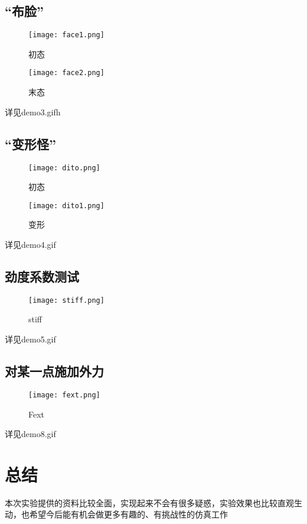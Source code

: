 \documentclass[14pt]{scrartcl} %
\begin{document}
\pagebreak
\subsection{“布脸”}
\begin{figure}[h] %
	\centering
	\texttt{[image: face1.png]} %
	\caption{初态}
\end{figure}
\begin{figure}[h] %
	\centering
	\texttt{[image: face2.png]} %
	\caption{末态}
\end{figure}
详见demo3.gifh

\pagebreak
\subsection{“变形怪”}
\begin{figure}[h] %
	\centering
	\texttt{[image: dito.png]} %
	\caption{初态}
\end{figure}
\begin{figure}[h] %
	\centering
	\texttt{[image: dito1.png]} %
	\caption{变形}
\end{figure}
详见demo4.gif

\pagebreak
\subsection{劲度系数测试}
\begin{figure}[h] %
	\centering
	\texttt{[image: stiff.png]} %
	\caption{stiff}
\end{figure}
详见demo5.gif

\subsection{对某一点施加外力}

\begin{figure}[h] %
	\centering
	\texttt{[image: fext.png]} %
	\caption{Fext}
\end{figure}
详见demo8.gif

\pagebreak
\section{总结}
本次实验提供的资料比较全面，实现起来不会有很多疑惑，实验效果也比较直观生动，也希望今后能有机会做更多有趣的、有挑战性的仿真工作



\end{document}
